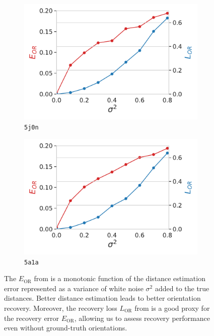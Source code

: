 \begin{figure}
    \centering
    \begin{subfigure}[b]{0.49\linewidth}
        \includegraphics[width=\linewidth]{figures/5j0n_perfect_noisy_ar_aa}
        \caption{\texttt{5j0n}}
    \end{subfigure}
    \begin{subfigure}[b]{0.49\linewidth}
    \centering
        \includegraphics[width=\linewidth]{figures/5a1a_perfect_noisy_ar_aa}
        \caption{\texttt{5a1a}}
    \end{subfigure}
    \caption{
        The $E_\text{OR}$ from  is a monotonic function of the distance estimation error represented as a variance of white noise $\sigma^2$ added to the true distances.
        Better distance estimation leads to better orientation recovery.
        Moreover, the recovery loss $L_\text{OR}$ from  is a good proxy for the recovery error $E_\text{OR}$, allowing us to assess recovery performance even without ground-truth orientations.
    }\label{fig:perfect-with-noise-ar-aa}
    

\end{figure}
